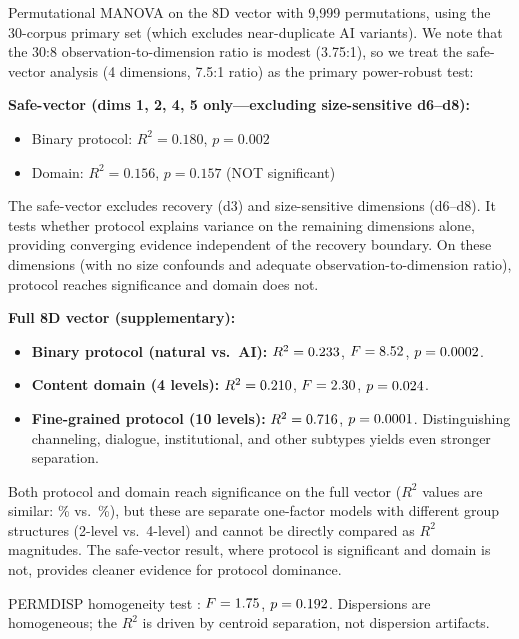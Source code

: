 \documentclass[final]{clv2025}
\begin{document}
Permutational MANOVA on the 8D vector with 9,999 permutations, using the 30-corpus primary set (which excludes near-duplicate AI variants). We note that the 30:8 observation-to-dimension ratio is modest (3.75:1), so we treat the safe-vector analysis (4 dimensions, 7.5:1 ratio) as the primary power-robust test:

\textbf{Safe-vector (dims 1, 2, 4, 5 only---excluding size-sensitive d6--d8):}
\begin{itemize}
\item Binary protocol: $R^2 = 0.180$, $p = 0.002$
\item Domain: $R^2 = 0.156$, $p = 0.157$ (NOT significant)
\end{itemize}

The safe-vector excludes recovery (d3) and size-sensitive dimensions (d6--d8). It tests whether protocol explains variance on the remaining dimensions alone, providing converging evidence independent of the recovery boundary. On these dimensions (with no size confounds and adequate observation-to-dimension ratio), protocol reaches significance and domain does not.

\textbf{Full 8D vector (supplementary):}
\begin{itemize}
\item \textbf{Binary protocol (natural vs.\ AI):} $R^2 = 0.233$, $F = 8.52$, $p = 0.0002$.
\item \textbf{Content domain (4 levels):} $R^2 = 0.210$, $F = 2.30$, $p = 0.024$.
\item \textbf{Fine-grained protocol (10 levels):} $R^2 = 0.716$, $p = 0.0001$. Distinguishing channeling, dialogue, institutional, and other subtypes yields even stronger separation.
\end{itemize}

Both protocol and domain reach significance on the full vector ($R^2$ values are similar: \permProtocolPercent\% vs.\ \permDomainPercent\%), but these are separate one-factor models with different group structures (2-level vs.\ 4-level) and cannot be directly compared as $R^2$ magnitudes. The safe-vector result, where protocol is significant and domain is not, provides cleaner evidence for protocol dominance.

PERMDISP homogeneity test \citep{anderson2006distance}: $F = 1.75$, $p = 0.192$. Dispersions are homogeneous; the $R^2$ is driven by centroid separation, not dispersion artifacts.
\end{document}
